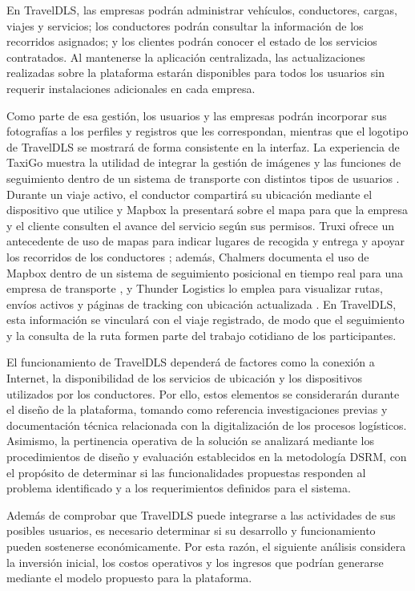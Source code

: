 En TravelDLS, las empresas podrán administrar vehículos, conductores, cargas, viajes y servicios; los conductores podrán consultar la información de los recorridos asignados; y los clientes podrán conocer el estado de los servicios contratados. Al mantenerse la aplicación centralizada, las actualizaciones realizadas sobre la plataforma estarán disponibles para todos los usuarios sin requerir instalaciones adicionales en cada empresa.

Como parte de esa gestión, los usuarios y las empresas podrán incorporar sus fotografías a los perfiles y registros que les correspondan, mientras que el logotipo de TravelDLS se mostrará de forma consistente en la interfaz. La experiencia de TaxiGo muestra la utilidad de integrar la gestión de imágenes y las funciones de seguimiento dentro de un sistema de transporte con distintos tipos de usuarios \parencite{yaqoub2024taxigo}. Durante un viaje activo, el conductor compartirá su ubicación mediante el dispositivo que utilice y Mapbox la presentará sobre el mapa para que la empresa y el cliente consulten el avance del servicio según sus permisos. Truxi ofrece un antecedente de uso de mapas para indicar lugares de recogida y entrega y apoyar los recorridos de los conductores \parencite{vad2020truxi}; además, Chalmers documenta el uso de Mapbox dentro de un sistema de seguimiento posicional en tiempo real para una empresa de transporte \parencite{aronsson2021tracking}, y Thunder Logistics lo emplea para visualizar rutas, envíos activos y páginas de tracking con ubicación actualizada \parencite{deyheralde2026thunder}. En TravelDLS, esta información se vinculará con el viaje registrado, de modo que el seguimiento y la consulta de la ruta formen parte del trabajo cotidiano de los participantes.

El funcionamiento de TravelDLS dependerá de factores como la conexión a Internet, la disponibilidad de los servicios de ubicación y los dispositivos utilizados por los conductores. Por ello, estos elementos se considerarán durante el diseño de la plataforma, tomando como referencia investigaciones previas y documentación técnica relacionada con la digitalización de los procesos logísticos. Asimismo, la pertinencia operativa de la solución se analizará mediante los procedimientos de diseño y evaluación establecidos en la metodología DSRM, con el propósito de determinar si las funcionalidades propuestas responden al problema identificado y a los requerimientos definidos para el sistema.

Además de comprobar que TravelDLS puede integrarse a las actividades de sus posibles usuarios, es necesario determinar si su desarrollo y funcionamiento pueden sostenerse económicamente. Por esta razón, el siguiente análisis considera la inversión inicial, los costos operativos y los ingresos que podrían generarse mediante el modelo propuesto para la plataforma.

